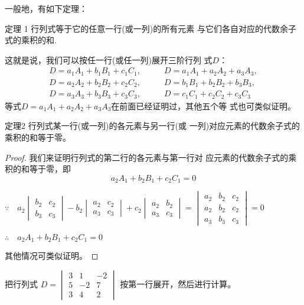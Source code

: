 一般地，有如下定理：

\begin{thm}
{定理 1} 行列式等于它的任意一行(或一列)的所有元素
与它们各自对应的代数余子式的乘积的和.  
\end{thm}

这就是说，我们可以按任一行(或任一列)展开三阶行列
式$D$：
\[\begin{split}
  D=a_{1}A_{1}+b_{1}B_{1}+c_{1}C_{1},&\qquad D=a_{1}A_{1}+a_{2}A_{2}+a_{3}A_{3},\\
  D=a_{2}A_{2}+b_{2}B_{2}+c_{2}C_{2},&\qquad D=b_{1}B_{1}+b_{2}B_{2}+b_{3}B_{3},\\
  D=a_{3}A_{3}+b_{3}B_{3}+c_{3}C_{3},&\qquad D=c_{1}C_{1}+c_{2}C_{2}+c_{3}C_{3}
\end{split}\]
等式$D=a_1A_1+a_2A_2+a_3A_3$在前面已经证明过，其他五个等
式也可类似证明。

\begin{thm}
  {定理2} 行列式某一行(或一列)的各元素与另一行(或
一列)对应元素的代数余子式的乘积的和等于零。
\end{thm}

\begin{proof}
我们来证明行列式的第二行的各元素与第一行对
应元素的代数余子式的乘积的和等于零，即
\[a_2A_1+b_2B_1+c_2C_1=0\]

$\because\quad a_2\begin{vmatrix}b_2&c_2\\b_3&c_3\end{vmatrix}-b_2\begin{vmatrix}a_2&c_2\\a_3&c_3\end{vmatrix}+c_2\begin{vmatrix}a_2&b_2\\a_3&c_3\end{vmatrix}=\begin{vmatrix}a_2&b_2&c_2\\a_2&b_2&c_2\\a_3&b_3&c_3\end{vmatrix}=0$

$\therefore\quad a_{2}A_{1}+ b_{2}B_{1}+ c_{2}C_{1}= 0$

其他情况可类似证明。  
\end{proof}

\begin{example}
  把行列式
$D=\begin{vmatrix}3&1&-2\\5&-2&7\\3&4&2\end{vmatrix}$
按第一行展开，然后进行计算。
\end{example}

